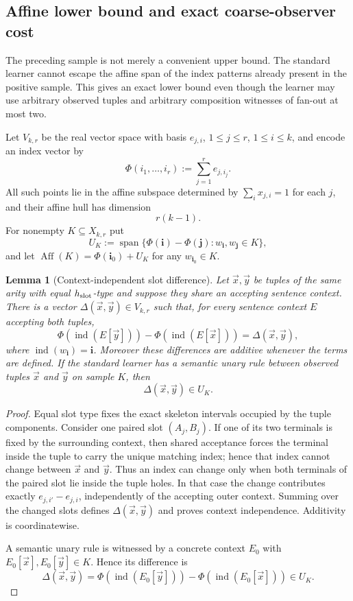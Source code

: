 \documentclass[11pt]{article}
\newtheorem{lemma}[definition]{Lemma}
\begin{document}
\subsection{Affine lower bound and exact coarse-observer cost}

The preceding sample is not merely a convenient upper bound.  The standard
learner cannot escape the affine span of the index patterns already present in
the positive sample.  This gives an exact lower bound even though the learner
may use arbitrary observed tuples and arbitrary composition
witnesses of fan-out at most two.

Let $V_{k,r}$ be the real vector space with basis
$e_{j,i}$, $1\le j\le r$, $1\le i\le k$, and encode an index vector by
\[
  \Phi(i_1,\ldots,i_r):=\sum_{j=1}^r e_{j,i_j}.
\]
All such points lie in the affine subspace determined by
$\sum_i x_{j,i}=1$ for each $j$, and their affine hull has dimension
\[
  r(k-1).
\]
For nonempty $K\subseteq X_{k,r}$ put
\[
 U_K:=\operatorname{span}\{\Phi(\mathbf i)-\Phi(\mathbf j):
       w_{\mathbf i},w_{\mathbf j}\in K\},
\]
and let
$\operatorname{Aff}(K)=\Phi(\mathbf i_0)+U_K$ for any
$w_{\mathbf i_0}\in K$.

\begin{lemma}[Context-independent slot difference]
\label{lem:slot-difference}
Let $\vec x,\vec y$ be tuples of the same arity with equal
$h_{\rm slot}$-type and suppose they share an accepting sentence context.
There is a vector $\Delta(\vec x,\vec y)\in V_{k,r}$ such that, for every
sentence context $E$ accepting both tuples,
\[
  \Phi(\operatorname{ind}(E[\vec y]))
  -\Phi(\operatorname{ind}(E[\vec x]))
  =\Delta(\vec x,\vec y),
\]
where $\operatorname{ind}(w_{\mathbf i})=\mathbf i$.
Moreover these differences are additive whenever the terms are defined.
If the standard learner has a semantic unary rule between observed tuples
$\vec x$ and $\vec y$ on sample $K$, then
\[
  \Delta(\vec x,\vec y)\in U_K.
\]
\end{lemma}

\begin{proof}
Equal slot type fixes the exact skeleton intervals occupied by the tuple
components.  Consider one paired slot $(A_j,B_j)$.  If one of its two terminals
is fixed by the surrounding context, then shared acceptance forces the terminal
inside the tuple to carry the unique matching index; hence that index cannot
change between $\vec x$ and $\vec y$.  Thus an index can change only when both
terminals of the paired slot lie inside the tuple holes.  In that case the
change contributes exactly
$e_{j,i'}-e_{j,i}$, independently of the accepting outer context.  Summing over
the changed slots defines $\Delta(\vec x,\vec y)$ and proves context
independence.  Additivity is coordinatewise.

A semantic unary rule is witnessed by a concrete context $E_0$ with
$E_0[\vec x],E_0[\vec y]\in K$.  Hence its difference is
\[
 \Delta(\vec x,\vec y)
 =\Phi(\operatorname{ind}(E_0[\vec y]))
  -\Phi(\operatorname{ind}(E_0[\vec x]))\in U_K.
\]
\end{proof}
\end{document}

